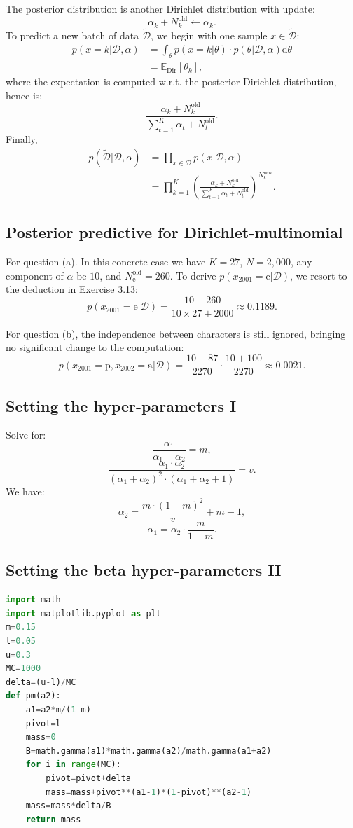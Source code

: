 \documentclass[UTF8]{ctexart}
\begin{document}
The posterior distribution is another Dirichlet distribution with update:
$$\alpha_{k}+N_{k}^{\text{old}}\leftarrow \alpha_{k}.$$
To predict a new batch of data $\tilde{\mathcal{D}}$, we begin with one sample $x\in\tilde{\mathcal{D}}$:
$$
\begin{aligned}
p(x=k|\mathcal{D},\alpha)&=\int_{\theta}p(x=k|\theta)\cdot p(\theta|\mathcal{D},\alpha)\text{d}\theta\\
&=\mathbb{E}_{\text{Dir}}[\theta_{k}],
\end{aligned}
$$
where the expectation is computed w.r.t. the posterior Dirichlet distribution, hence is:
$$\frac{\alpha_{k}+N_{k}^{\text{old}}}{\sum_{t=1}^{K}\alpha_{t}+N_{t}^{\text{old}}}.$$
Finally,
$$
\begin{aligned}
p(\tilde{\mathcal{D}}|\mathcal{D},\alpha)&=\prod_{x\in\tilde{\mathcal{D}}}p(x|\mathcal{D},\alpha)\\
&=\prod_{k=1}^{K}\left( \frac{\alpha_{k}+N_{k}^{\text{old}}}{\sum_{t=1}^{K}\alpha_{t}+N_{t}^{\text{old}}} \right)^{N_{k}^{\text{new}}}.
\end{aligned}
$$

\subsection{Posterior predictive for Dirichlet-multinomial}
For question (a).
In this concrete case we have $K=27$, $N=2,000$, any component of $\alpha$ be $10$, and $N_{\text{e}}^{\text{old}}=260$. 
To derive $p(x_{2001}=\text{e}|\mathcal{D})$, we resort to the deduction in Exercise 3.13:
$$p(x_{2001}=\text{e}|\mathcal{D})=\frac{10+260}{10\times 27+2000}\approx 0.1189.$$

For question (b), the independence between characters is still ignored, bringing no significant change to the computation:
$$p(x_{2001}=\text{p},x_{2002}=\text{a}|\mathcal{D})=\frac{10+87}{2270}\cdot \frac{10+100}{2270}\approx 0.0021.$$

\subsection{Setting the hyper-parameters I}
Solve for: 
$$\frac{\alpha_{1}}{\alpha_{1}+\alpha_{2}}=m,$$
$$\frac{\alpha_{1}\cdot\alpha_{2}}{(\alpha_{1}+\alpha_{2})^{2}\cdot(\alpha_{1}+\alpha_{2}+1)}=v.$$
We have:
$$\alpha_{2}=\frac{m\cdot(1-m)^{2}}{v}+m-1,$$
$$\alpha_{1}=\alpha_{2}\cdot\frac{m}{1-m}.$$


\subsection{Setting the beta hyper-parameters II}
\begin{lstlisting}[language=Python]
import math
import matplotlib.pyplot as plt
m=0.15
l=0.05
u=0.3
MC=1000
delta=(u-l)/MC
def pm(a2):
    a1=a2*m/(1-m)
    pivot=l
    mass=0
    B=math.gamma(a1)*math.gamma(a2)/math.gamma(a1+a2)
    for i in range(MC):
        pivot=pivot+delta
        mass=mass+pivot**(a1-1)*(1-pivot)**(a2-1)
    mass=mass*delta/B
    return mass
\end{lstlisting}  
\end{document}
